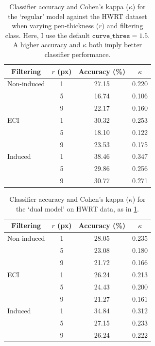 \documentclass{mpaper}
\begin{document}
\begin{table}
\centering

\begin{tabular}{lccc}
\toprule
\multicolumn{1}{c}{Filtering} & $r$ (px) & Accuracy (\si{\percent}) & $\kappa$ \\
\midrule
Non-induced & 1 & 27.15 & 0.220 \\
& 5 & 16.74 & 0.106 \\
& 9 & 22.17 & 0.160 \\

ECI & 1 & 30.32 & 0.253 \\
& 5 & 18.10 & 0.122 \\
& 9 & 23.53 & 0.175 \\

Induced & 1 & 38.46 & 0.347 \\
& 5 & 29.86 & 0.256 \\
& 9 & 30.77 & 0.271 \\
\bottomrule
\end{tabular}

\vspace{0.5em}
\caption{
	Classifier accuracy and Cohen's kappa ($\kappa$) for the `regular' model against the HWRT dataset when varying pen-thickness ($r$) and filtering class.
	Here, I use the default $\mathtt{curve\_thres}=1.5$.
	A higher accuracy and $\kappa$ both imply better classifier performance.%
	\label{tab:exp2-reg}
}
\end{table}

\begin{table}
	\centering
	
	\begin{tabular}{lccc}
		\toprule
		\multicolumn{1}{c}{Filtering} & $r$ (px) & Accuracy (\si{\percent}) & $\kappa$ \\
		\midrule
		Non-induced & 1 & 28.05 & 0.235 \\
		& 5 & 23.08 & 0.180 \\
		& 9 & 21.72 & 0.166 \\
		
		ECI & 1 & 26.24 & 0.213 \\
		& 5 & 24.43 & 0.200 \\
		& 9 & 21.27 & 0.161 \\
		
		Induced & 1 & 34.84 & 0.312 \\
		& 5 & 27.15 & 0.233 \\
		& 9 & 26.24 & 0.222 \\
		\bottomrule
	\end{tabular}
	
	\vspace{0.5em}
	\caption{
		Classifier accuracy and Cohen's kappa ($\kappa$) for the `dual model' on HWRT data, as in \cref{tab:exp2-reg}.
		\label{tab:exp2-dual}
	}
\end{table}
\end{document}
